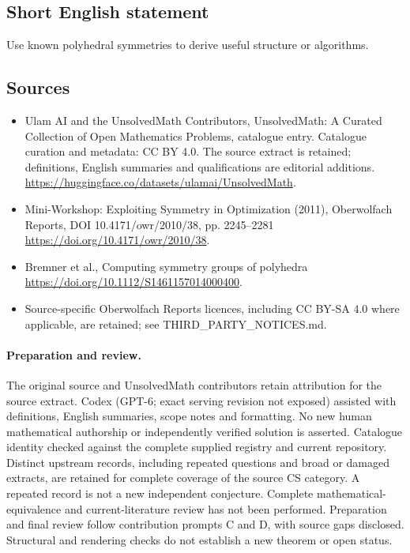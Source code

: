 \documentclass[11pt]{article}
\begin{document}
\subsection{Short English statement}
Use known polyhedral symmetries to derive useful structure or algorithms.
\subsection{Sources}
\begin{itemize}
\item[\hypertarget{source:statement:1}{S1}] Ulam AI and the UnsolvedMath Contributors, UnsolvedMath: A Curated Collection of Open Mathematics Problems, catalogue entry. Catalogue curation and metadata: CC BY 4.0. The source extract is retained; definitions, English summaries and qualifications are editorial additions.
\url{https://huggingface.co/datasets/ulamai/UnsolvedMath}.
\item[\hypertarget{source:statement:2}{S2}] Mini-Workshop: Exploiting Symmetry in Optimization (2011), Oberwolfach Reports, DOI 10.4171/owr/2010/38, pp. 2245--2281
\url{https://doi.org/10.4171/owr/2010/38}.
\item[\hypertarget{source:statement:3}{S3}] Bremner et al., Computing symmetry groups of polyhedra
\url{https://doi.org/10.1112/S1461157014000400}.
\item Source-specific Oberwolfach Reports licences, including CC BY-SA 4.0 where applicable, are retained; see THIRD\_PARTY\_NOTICES.md.
\end{itemize}
\paragraph{Preparation and review.}
The original source and UnsolvedMath contributors retain attribution for the source extract. Codex (GPT-6; exact serving revision not exposed) assisted with definitions, English summaries, scope notes and formatting. No new human mathematical authorship or independently verified solution is asserted. Catalogue identity checked against the complete supplied registry and current repository. Distinct upstream records, including repeated questions and broad or damaged extracts, are retained for complete coverage of the source CS category. A repeated record is not a new independent conjecture. Complete mathematical-equivalence and current-literature review has not been performed. Preparation and final review follow contribution prompts C and D, with source gaps disclosed. Structural and rendering checks do not establish a new theorem or open status.
\label{end:statement}
\end{document}
